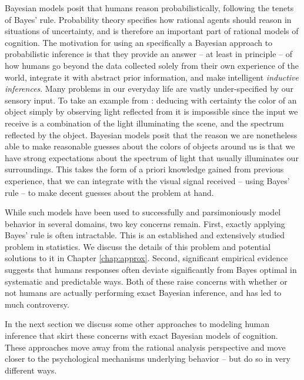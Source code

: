 Bayesian models posit that humans reason probabilistically, following the tenets of Bayes' rule. Probability theory specifies how rational agents should reason in situations of uncertainty\cite{hacking2006emergence, gigerenzer1990empire}, and is therefore an important part of rational models of cognition. The motivation for using an specifically a Bayesian approach to probabilistic inference is that they provide an answer -- at least in principle -- of how humans go beyond the data collected solely from their own experience of the world, integrate it with abstract prior information, and make intelligent \textit{inductive inferences}. Many problems in our everyday life are vastly under-specified by our sensory input. To take an example from \citet{griffiths2008bayesian}: deducing with certainty the color of an object simply by observing light reflected from it is impossible since the input we receive is a combination of the light illuminating the scene, and the spectrum reflected by the object. Bayesian models posit that the reason we are nonetheless able to make reasonable guesses about the colors of objects around us is that we have strong expectations about the spectrum of light that usually illuminates our surroundings. This takes the form of a priori knowledge gained from previous experience, that we can integrate with the visual signal received -- using Bayes' rule -- to make decent guesses about the problem at hand.

While such models have been used to successfully and parsimoniously model behavior in several domains, two key concerns remain. First, exactly applying Bayes' rule is often intractable. This is an established and extensively studied problem in statistics. We discuss the details of this problem and potential solutions to it in Chapter \ref{chap:approx}. Second, significant empirical evidence suggests that humans responses often deviate significantly from Bayes optimal in systematic and predictable ways\citep{tversky1974judgment, slovic1971comparison, grether1980bayes, fischhoff1983hypothesis}. Both of these raise concerns with whether or not humans are actually performing exact Bayesian inference, and has led to much controversy\citep{mellers2001frequency, gigerenzer1996narrow, samuels2012ending}. 

In the next section we discuss some other approaches to modeling human inference that skirt these concerns with exact Bayesian models of cognition. These approaches move away from the rational analysis perspective and move closer to the psychological mechanisms underlying behavior -- but do so in very different ways.

